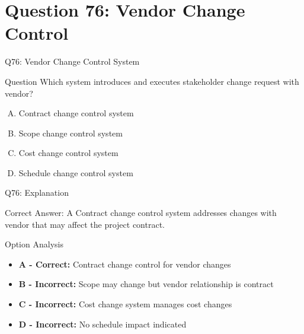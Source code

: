 \documentclass{beamer}
\begin{document}
	\section{Question 76: Vendor Change Control}
	
	\begin{frame}{Q76: Vendor Change Control System}
		\begin{block}{Question}
			Which system introduces and executes stakeholder change request with vendor?
		\end{block}
		\begin{enumerate}[(A)]
			\item Contract change control system
			\item Scope change control system
			\item Cost change control system\item Schedule change control system
		\end{enumerate}
	\end{frame}
	
	\begin{frame}{Q76: Explanation}
		\begin{block}{Correct Answer: A}
			Contract change control system addresses changes with vendor that may affect the project contract.
		\end{block}
		\begin{block}{Option Analysis}
			\begin{itemize}
				\item \textbf{A - Correct:} Contract change control for vendor changes
				\item \textbf{B - Incorrect:} Scope may change but vendor relationship is contract
				\item \textbf{C - Incorrect:} Cost change system manages cost changes
				\item \textbf{D - Incorrect:} No schedule impact indicated
			\end{itemize}
		\end{block}
	\end{frame}
	
	
	
	
\end{document}
